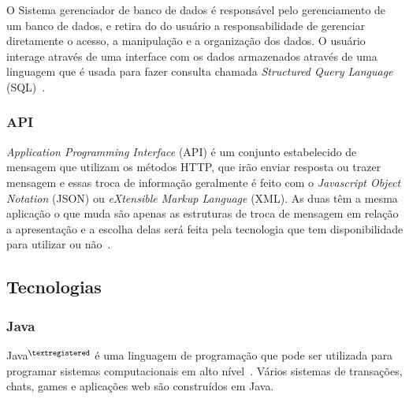 

O Sistema gerenciador de banco de dados é responsável pelo gerenciamento de um banco de dados, e retira do do usuário a responsabilidade de gerenciar diretamente o acesso, a manipulação e a organização dos dados.
O usuário interage através de uma interface com os dados armazenados através de uma linguagem que é usada para fazer consulta chamada \textit{Structured Query Language} (SQL)~\cite{laundon2007sistemas}.

\subsubsection{API}

 \textit{Application Programming Interface} (API) é um conjunto estabelecido de mensagem que utilizam os métodos HTTP, que irão enviar resposta ou trazer mensagem e essas troca de informação geralmente é feito com o \textit{Javascript Object Notation} (JSON) ou \textit{eXtensible Markup Language} (XML).
 As duas têm a mesma aplicação o que muda são apenas as estruturas de troca de mensagem em relação a apresentação e a escolha delas será feita pela tecnologia que tem disponibilidade para utilizar ou não~\cite{oliveira2015desenvolvimento}.

\subsection{Tecnologias}


\subsubsection{Java}

Java$^{\tiny{\textregistered}}$ é uma linguagem de programação que pode ser utilizada para programar sistemas computacionais em alto nível~\cite{batista2017desenvolvendo}. 
Vários sistemas de transações, chats, games e aplicações web são construídos em Java.

